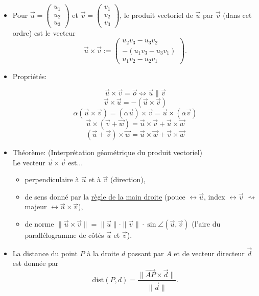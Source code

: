 \documentclass[12pt,a4paper]{article}
\newcommand{\vect}{\overrightarrow}
\begin{document}
\begin{itemize}[label=$\bullet$]
\item Pour $\vect{u}=\begin{pmatrix}
u_1\\u_2\\u_3
\end{pmatrix}$ et $\vect{v}=\begin{pmatrix}
v_1\\v_2\\v_3
\end{pmatrix}$, le \colorbox{def!40}{produit vectoriel} de $\vect{u}$ par $\vect{v}$ (dans cet ordre) est le vecteur $$\vect{u}\times\vect{v}:=\begin{pmatrix}
u_2v_3-u_3v_2\\-(u_1v_3-u_3v_1)\\u_1v_2-u_2v_1
\end{pmatrix}.$$

\item \textcolor{th!60!black}{Propriétés:}

 $$\vect{u}\times\vect{v}=\vect{o}\Longleftrightarrow \vect{u}\parallel\vect{v}$$
 $$\vect{v}\times\vect{u}=-(\vect{u}\times\vect{v})$$
 $$\alpha(\vect{u}\times\vect{v})=(\alpha\vect{u})\times\vect{v}=\vect{u}\times(\alpha\vect{v})$$
$$\vect{u}\times(\vect{v}+\vect{w})=\vect{u}\times\vect{v}+\vect{u}\times\vect{w}$$
$$(\vect{u}+\vect{v})\times\vect{w}=\vect{u}\times\vect{w}+\vect{v}\times\vect{w}$$

\item \textcolor{th!60!black}{Théorème:} (Interprétation géométrique du produit vectoriel)\\
Le vecteur $\vect{u}\times\vect{v}$ est...
\begin{itemize}[label=$\circ$]
\item perpendiculaire à $\vect{u}$ et à $\vect{v}$ (\colorbox{def!40}{direction}),
\item de \colorbox{def!40}{sens} donné par la \underline{règle de la main droite} (pouce $\leftrightarrow\vect{u}$, index $\leftrightarrow\vect{v}$ $\rightsquigarrow$ majeur $\leftrightarrow\vect{u}\times\vect{v}$),
\item de \colorbox{def!40}{norme} $\|\vect{u}\times\vect{v}\|=\|\vect{u}\|\cdot\|\vect{v}\|\cdot\sin\angle(\vect{u},\vect{v})$ (l'aire du parallélogramme de côtés $\vect{u}$ et $\vect{v}$).
\end{itemize}
\item La \colorbox{def!40}{distance du point} $P$ \colorbox{def!40}{à la droite} $d$ passant par $A$ et de vecteur directeur $\vect{d}$ est donnée par 
$$\mathrm{dist}(P,d)=\displaystyle \frac{\|\vect{AP}\times\vect{d}\|}{\|\vect{d}\|}.$$
\end{itemize}
\end{document}
